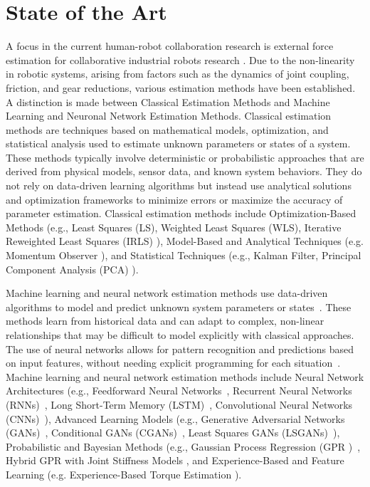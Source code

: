 \chapter{State of the Art}

    A focus in the current human-robot collaboration research is external force estimation for collaborative
    industrial robots research \cite{bai2024sensorless, Popov2019, nadeau2022fast, kurdas2022online, su2021deep}. Due to the non-linearity in robotic systems, arising from factors such as the dynamics of joint coupling, friction, and gear reductions, various estimation methods have been established. A distinction is made between Classical Estimation Methods and Machine Learning and Neuronal Network Estimation Methods. Classical estimation methods are techniques based on mathematical models, optimization, and statistical analysis used to estimate unknown parameters or states of a system. These methods typically involve deterministic or probabilistic approaches that are derived from physical models, sensor data, and known system behaviors. They do not rely on data-driven learning algorithms but instead use analytical solutions and optimization frameworks to minimize errors or maximize the accuracy of parameter estimation. Classical estimation methods include Optimization-Based Methods (e.g., Least Squares (LS), Weighted Least Squares (WLS), Iterative Reweighted Least Squares (IRLS) \cite{dong2023dynamic, nadeau2022fast, golluccio2021robot, Xu2022accurate}), Model-Based and Analytical Techniques (e.g. Momentum Observer \cite{kurdas2022online}), and Statistical Techniques (e.g., Kalman Filter, Principal Component Analysis (PCA) \cite{liu2021sensorless,motor_current_estimation, berger2021feature}).
    
    Machine learning and neural network estimation methods use data-driven algorithms to model and predict unknown system parameters or states~\cite{ren2020learning, su2021deep}. These methods learn from historical data and can adapt to complex, non-linear relationships that may be difficult to model explicitly with classical approaches. The use of neural networks allows for pattern recognition and predictions based on input features, without needing explicit programming for each situation~\cite{zeng2019tossingbot, Kruzic2021}. Machine learning and neural network estimation methods include Neural Network Architectures (e.g., Feedforward Neural Networks~\cite{su2021deep}, Recurrent Neural Networks (RNNs)~\cite{berger2016estimating}, Long Short-Term Memory (LSTM)~\cite{berger2021feature, Kruzic2021}, Convolutional Neural Networks (CNNs)~\cite{Kruzic2021, zeng2019tossingbot}), Advanced Learning Models (e.g., Generative Adversarial Networks (GANs)~\cite{ren2020learning}, Conditional GANs (CGANs)~\cite{ren2020learning}, Least Squares GANs (LSGANs)~\cite{ren2020learning}), Probabilistic and Bayesian Methods (e.g., Gaussian Process Regression (GPR \cite{rasmussen2006gaussian})~\cite{haninger2022model, beckers2017stable,nguyen2008learning, HANINGER2023104431}, Hybrid GPR with Joint Stiffness Models \cite{blumberg2023estimation}, and Experience-Based and Feature Learning (e.g. Experience-Based Torque Estimation \cite{berger2016estimating, berger2015learning}).

